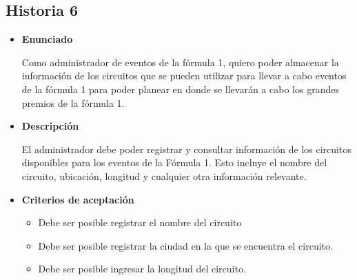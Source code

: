 \documentclass{article}
\begin{document}
	\subsection{Historia 6}
	\begin{itemize}
		
		\item \large{\textbf{Enunciado}}
		\begin{description}
			Como administrador de eventos de la fórmula 1, quiero poder almacenar la información de los circuitos que se pueden utilizar para llevar a cabo eventos de la fórmula 1 para poder planear en donde se llevarán a cabo los grandes premios de la fórmula 1.
			
		\end{description}
		
		\item \large{\textbf{Descripción}}
		\begin{description}
			El administrador debe poder registrar y consultar información de los circuitos disponibles para los eventos de la Fórmula 1. Esto incluye el nombre del circuito, ubicación, longitud y cualquier otra información relevante. 
			
		\end{description}
		
		\item \large{\textbf{Criterios de aceptación}}
		\begin{itemize}
			\item Debe ser posible registrar el nombre del circuito
			\item Debe ser posible registrar la ciudad en la que se encuentra el circuito.
			\item Debe ser posible ingresar la longitud del circuito. 
			
		\end{itemize}
		
	\end{itemize}
	
\end{document}

